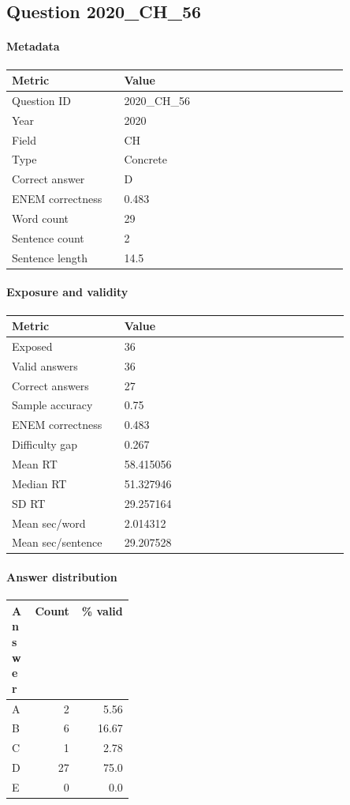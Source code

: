 \subsection*{Question 2020\_CH\_56}
\label{sec:q_2020_CH_56}
\paragraph{Metadata}
\begin{tabular}{p{0.30\linewidth}p{0.60\linewidth}}
\toprule
Metric & Value\\
\midrule
Question ID & 2020\_CH\_56\\
Year & 2020\\
Field & CH\\
Type & Concrete\\
Correct answer & D\\
ENEM correctness & 0.483\\
Word count & 29\\
Sentence count & 2\\
Sentence length & 14.5\\
\bottomrule
\end{tabular}

\paragraph{Exposure and validity}
\begin{tabular}{p{0.30\linewidth}p{0.60\linewidth}}
\toprule
Metric & Value\\
\midrule
Exposed & 36\\
Valid answers & 36\\
Correct answers & 27\\
Sample accuracy & 0.75\\
ENEM correctness & 0.483\\
Difficulty gap & 0.267\\
Mean RT & 58.415056\\
Median RT & 51.327946\\
SD RT & 29.257164\\
Mean sec/word & 2.014312\\
Mean sec/sentence & 29.207528\\
\bottomrule
\end{tabular}

\paragraph{Answer distribution}
\begin{tabular}{p{0.18\linewidth}rr}
\toprule
Answer & Count & \% valid\\
\midrule
A & 2 & 5.56\\
B & 6 & 16.67\\
C & 1 & 2.78\\
D & 27 & 75.0\\
E & 0 & 0.0\\
\bottomrule
\end{tabular}

